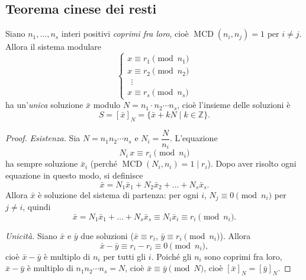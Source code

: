 \documentclass[11pt,a4paper]{article}
\begin{document}
\subsection{Teorema cinese dei resti}

\begin{teorema}
Siano $n_1, \dots, n_s$ interi positivi \emph{coprimi fra loro}, cioè $\operatorname{MCD}(n_i, n_j) = 1$ per $i \neq j$. Allora il sistema modulare
\[
  \begin{cases}
    x \equiv r_1 \pmod{n_1} \\
    x \equiv r_2 \pmod{n_2} \\
    \ \ \vdots \\
    x \equiv r_s \pmod{n_s}
  \end{cases}
\]
ha un'\emph{unica} soluzione $\bar{x}$ modulo $N = n_1\cdot n_2\cdots n_s$, cioè l'insieme delle soluzioni è
\[
  S = [\bar{x}]_N = \{\bar{x} + kN \mid k \in \mathbb{Z}\}.
\]
\end{teorema}

\begin{proof}
\emph{Esistenza.} Sia $N = n_1 n_2 \cdots n_s$ e $N_i = \dfrac{N}{n_i}$. L'equazione
\[
  N_i\, x \equiv r_i \pmod{n_i}
\]
ha sempre soluzione $\bar{x}_i$ (perché $\operatorname{MCD}(N_i, n_i) = 1 \mid r_i$). Dopo aver risolto ogni equazione in questo modo, si definisce
\[
  \bar{x} = N_1\bar{x}_1 + N_2\bar{x}_2 + \dots + N_s\bar{x}_s .
\]
Allora $\bar{x}$ è soluzione del sistema di partenza: per ogni $i$, $N_j \equiv 0 \pmod{n_i}$ per $j \neq i$, quindi
\[
  \bar{x} = N_1\bar{x}_1 + \dots + N_s\bar{x}_s \equiv N_i\bar{x}_i \equiv r_i \pmod{n_i}.
\]

\emph{Unicità.} Siano $\bar{x}$ e $\bar{y}$ due soluzioni ($\bar{x} \equiv r_i$, $\bar{y} \equiv r_i \pmod{n_i}$). Allora
\[
  \bar{x} - \bar{y} \equiv r_i - r_i \equiv 0 \pmod{n_i},
\]
cioè $\bar{x} - \bar{y}$ è multiplo di $n_i$ per tutti gli $i$. Poiché gli $n_i$ sono coprimi fra loro, $\bar{x} - \bar{y}$ è multiplo di $n_1 n_2 \cdots n_s = N$, cioè $\bar{x} \equiv \bar{y} \pmod N$, cioè $[\bar{x}]_N = [\bar{y}]_N$.
\end{proof}
\end{document}
